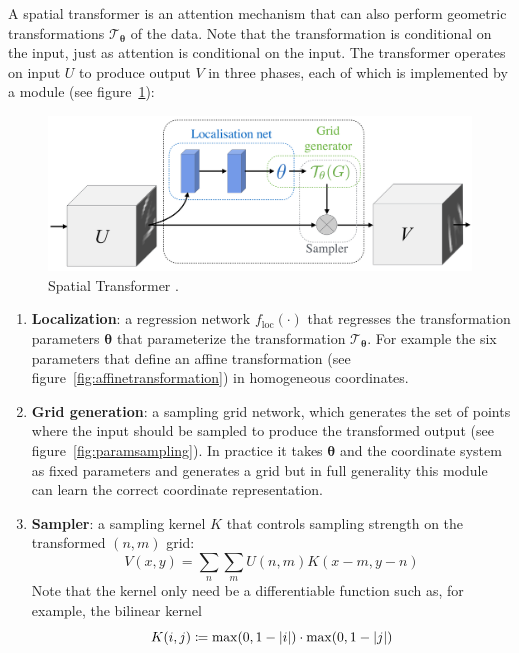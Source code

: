 A spatial transformer \cite{jaderberg2015spatial} is an attention mechanism that can also perform geometric transformations \(\mathcal{T}_{\bm{\theta}}\) of the data.
%
Note that the transformation is conditional on the input, just as attention is conditional on the input.
%
The transformer operates on input \(U\) to produce output \(V\) in three phases, each of which is implemented by a module (see figure~\ref{fig:spacetransformer}): 
%
\begin{figure}[!htbp]
    \centering
    \includegraphics[width=.49\textwidth]{figures/neural_networks/space_transformer.png}
    \caption{Spatial Transformer \cite{jaderberg2015spatial}.}\label{fig:spacetransformer}
\end{figure}
%
\begin{enumerate}
    \item \textbf{Localization}: a regression network \(f_{\text{loc}}(\cdot)\) that regresses the transformation parameters \(\bm{\theta}\) that parameterize the transformation \(\mathcal{T}_{\bm{\theta}}\). For example the six parameters that define an affine transformation (see figure~\ref{fig:affinetransformation}) in homogeneous coordinates.
    \item \textbf{Grid generation}: a sampling grid network, which generates the set of points where the input should be sampled to produce the transformed output (see figure~\ref{fig:paramsampling}). In practice it takes \(\bm{\theta}\) and the coordinate system as fixed parameters and generates a grid but in full generality this module can learn the correct coordinate representation.
    \item \textbf{Sampler}: a sampling kernel \(K\) that controls sampling strength on the transformed \((n,m)\) grid:
    \begin{equation*}
        V(x,y) = \sum_n \sum_m U(n,m) K(x-m, y-n)
    \end{equation*}
    Note that the kernel only need be a differentiable function such as, for example, the bilinear kernel \begin{equation*}
        K(i, j) \coloneqq \max(0, 1-\abs{i})\cdot \max(0, 1- \abs{j})
    \end{equation*}
\end{enumerate}
%
